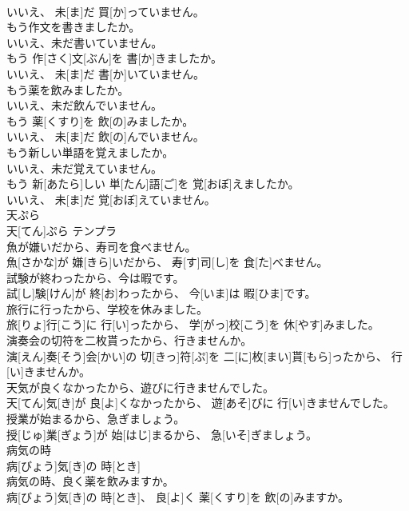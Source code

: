 \documentclass[8pt]{extreport}
\begin{document}
\begin{CJK}{UTF8}{min}
\\	いいえ、 未[ま]だ 買[か]っていません。
\\	もう作文を書きましたか。 
\\	いいえ、未だ書いていません。	
\\	もう 作[さく]文[ぶん]を 書[か]きましたか。 
\\	いいえ、 未[ま]だ 書[か]いていません。
\\	もう薬を飲みましたか。 
\\	いいえ、未だ飲んでいません。	
\\	もう 薬[くすり]を 飲[の]みましたか。 
\\	いいえ、 未[ま]だ 飲[の]んでいません。
\\	もう新しい単語を覚えましたか。 
\\	いいえ、未だ覚えていません。	
\\	もう 新[あたら]しい 単[たん]語[ご]を 覚[おぼ]えましたか。 
\\	いいえ、 未[ま]だ 覚[おぼ]えていません。
\\	天ぷら	
\\	天[てん]ぷら	テンプラ
\\	魚が嫌いだから、寿司を食べません。	
\\	魚[さかな]が 嫌[きら]いだから、 寿[す]司[し]を 食[た]べません。
\\	試験が終わったから、今は暇です。	
\\	試[し]験[けん]が 終[お]わったから、 今[いま]は 暇[ひま]です。
\\	旅行に行ったから、学校を休みました。	
\\	旅[りょ]行[こう]に 行[い]ったから、 学[がっ]校[こう]を 休[やす]みました。
\\	演奏会の切符を二枚貰ったから、行きませんか。	
\\	演[えん]奏[そう]会[かい]の 切[きっ]符[ぷ]を 二[に]枚[まい]貰[もら]ったから、 行[い]きませんか。
\\	天気が良くなかったから、遊びに行きませんでした。	
\\	天[てん]気[き]が 良[よ]くなかったから、 遊[あそ]びに 行[い]きませんでした。
\\	授業が始まるから、急ぎましょう。	
\\	授[じゅ]業[ぎょう]が 始[はじ]まるから、 急[いそ]ぎましょう。
\\	病気の時	
\\	病[びょう]気[き]の 時[とき]	
\\	病気の時、良く薬を飲みますか。	
\\	病[びょう]気[き]の 時[とき]、 良[よ]く 薬[くすり]を 飲[の]みますか。

\end{CJK}
\end{document}
